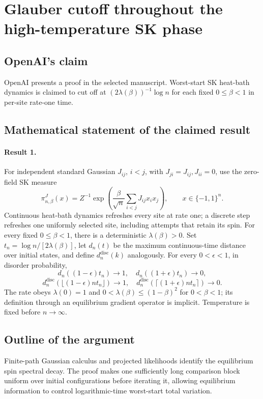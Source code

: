 \documentclass[11pt]{article}
\begin{document}
\section*{Glauber cutoff throughout the high-temperature SK phase}

\subsection{OpenAI's claim}
OpenAI presents a proof in the selected manuscript. Worst-start SK heat-bath dynamics is claimed to cut off at $(2\lambda(\beta))^{-1}\log n$ for each fixed $0\leq\beta<1$ in per-site rate-one time.

\subsection{Mathematical statement of the claimed result}
\paragraph{Result 1.} For independent standard Gaussian $J_{ij}$, $i<j$, with $J_{ji}=J_{ij},J_{ii}=0$, use the zero-field SK measure
\[
 \pi_{n,\beta}^J(x)=Z^{-1}\exp\left(\frac\beta{\sqrt n}\sum_{i<j}J_{ij}x_ix_j\right),\qquad x\in\{-1,1\}^n.
\]
Continuous heat-bath dynamics refreshes every site at rate one; a discrete step refreshes one uniformly selected site, including attempts that retain its spin. For every fixed $0\le\beta<1$, there is a deterministic $\lambda(\beta)>0$. Set $t_n=\log n/[2\lambda(\beta)]$, let $d_n(t)$ be the maximum continuous-time distance over initial states, and define $d_n^{\mathrm{disc}}(k)$ analogously. For every $0<\epsilon<1$, in disorder probability,
\[
 d_n((1-\epsilon)t_n)\to1,\quad d_n((1+\epsilon)t_n)\to0,
\]
\[
 d_n^{\mathrm{disc}}(\lfloor(1-\epsilon)nt_n\rfloor)\to1,\quad
 d_n^{\mathrm{disc}}(\lceil(1+\epsilon)nt_n\rceil)\to0.
\]
The rate obeys $\lambda(0)=1$ and $0<\lambda(\beta)\le(1-\beta)^2$ for $0<\beta<1$; its definition through an equilibrium gradient operator is implicit. Temperature is fixed before $n\to\infty$.

\subsection{Outline of the argument}
Finite-path Gaussian calculus and projected likelihoods identify the equilibrium spin spectral decay. The proof makes one sufficiently long comparison block uniform over initial configurations before iterating it, allowing equilibrium information to control logarithmic-time worst-start total variation.
\end{document}
